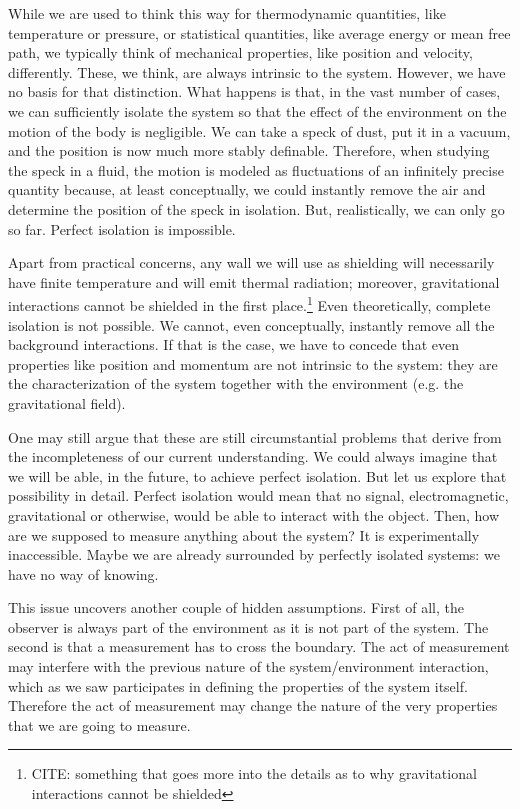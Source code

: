 \documentclass[10pt,twocolumn, nofootinbib]{revtex4-2}
\begin{document}
While we are used to think this way for thermodynamic quantities, like temperature or pressure, or statistical quantities, like average energy or mean free path, we typically think of mechanical properties, like position and velocity, differently. These, we think, are always intrinsic to the system. However, we have no basis for that distinction. What happens is that, in the vast number of cases, we can sufficiently isolate the system so that the effect of the environment on the motion of the body is negligible. We can take a speck of dust, put it in a vacuum, and the position is now much more stably definable. Therefore, when studying the speck in a fluid, the motion is modeled as fluctuations of an infinitely precise quantity because, at least conceptually, we could instantly remove the air and determine the position of the speck in isolation. But, realistically, we can only go so far. Perfect isolation is impossible.

Apart from practical concerns, any wall we will use as shielding will necessarily have finite temperature and will emit thermal radiation; moreover, gravitational interactions cannot be shielded in the first place.\footnote{CITE: something that goes more into the details as to why gravitational interactions cannot be shielded} Even theoretically, complete isolation is not possible. We cannot, even conceptually, instantly remove all the background interactions. If that is the case, we have to concede that even properties like position and momentum are not intrinsic to the system: they are the characterization of the system together with the environment (e.g. the gravitational field).

One may still argue that these are still circumstantial problems that derive from the incompleteness of our current understanding. We could always imagine that we will be able, in the future, to achieve perfect isolation. But let us explore that possibility in detail. Perfect isolation would mean that no signal, electromagnetic, gravitational or otherwise, would be able to interact with the object. Then, how are we supposed to measure anything about the system? It is experimentally inaccessible. Maybe we are already surrounded by perfectly isolated systems: we have no way of knowing.

This issue uncovers another couple of hidden assumptions. First of all, the observer is always part of the environment as it is not part of the system. The second is that a measurement has to cross the boundary. The act of measurement may interfere with the previous nature of the system/environment interaction, which as we saw participates in defining the properties of the system itself. Therefore the act of measurement may change the nature of the very properties that we are going to measure.
\end{document}
